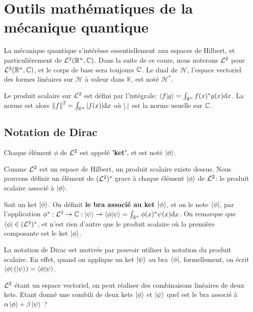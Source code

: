 \chapter{Outils mathématiques de la mécanique quantique}

La mécanique quantique s'intérèsse essentiellement aux espaces de Hilbert, et
particulièrement de $\mathcal{L}^{2}(\mathbb{R}^{n}, \mathbb{C})$. Dans la suite de ce
cours, nous noterons $\mathcal{L}^{2}$ pour $\mathcal{L}^{2}(\mathbb{R}^{n}, \mathbb{C})$, et le corps de
base sera toujours $\mathbb{C}$.
Le dual de $\mathcal{H}$, l'espace vectoriel des formes linéaires sur
$\mathcal{H}$ à valeur dans $\mathbb{K}$, est noté $\mathcal{H}^{*}$.

Le produit scalaire sur $\mathcal{L}^{2}$ est défini par l'intégrale: $\bra{f}\ket{g} =
\int_{\mathbb{R}^{n}} f(x)^{*} g(x) \mathrm{d}x$. La norme est alors $\norm{f}^{2} =
\int_{\mathbb{R}^{n}} \abs{f(x)} \mathrm{d}x$ où $\abs{.}$ est la norme usuelle sur
$\mathbb{C}$.

\section{Notation de Dirac}

\begin{definition} [Ket]
	Chaque élément $\phi$ de $\mathcal{L}^{2}$ est appelé \textbf{'ket'}, et est noté
	$\ket{\phi}$.
\end{definition}

Comme $\mathcal{L}^{2}$ est un espace de Hilbert, un produit scalaire existe dessus. Nous
pouvons définir un élément de $(\mathcal{L}^{2})^{*}$ grace à chaque élément $\ket{\phi}$
de $\mathcal{L}^{2}$: le produit scalaire associé à $\ket{\phi}$.

\begin{definition} [Bra]
	Soit un ket $\ket{\phi}$. On définit \textbf{le bra associé au ket
	$\ket{\phi}$}, et on le note $\bra{\phi}$, par l'application $\phi^{*} :
	\mathcal{L}^{2} \rightarrow \mathbb{C} : \ket{\psi} \rightarrow \bra{\phi}\ket{\psi} =
	\int_{\mathbb{R}^{n}} \phi(x)^{*} \psi(x) \mathrm{d}x$.
	On remarque que $\bra{\phi} \in (\mathcal{L}^{2})^{*}$, et n'est rien d'autre que le
	produit scalaire où la première composante est le ket $\ket{\phi}$.

	La notation de Dirac est motivée par pouvoir utiliser la notation du produit
	scalaire.
	En effet, quand on applique un ket $\ket{\psi}$ au bra $\bra{\phi}$,
	formellement, on écrit $\bra{\phi}(\ket{\psi}) = \bra{\phi}\ket{\psi}$.
\end{definition}

$\mathcal{L}^{2}$ étant un espace vectoriel, on peut réaliser des combinaisons linéaires
de deux kets. Etant donné une combili de deux kets $\ket{\phi}$ et $\ket{\psi}$
quel est le bra associé à $\alpha \ket{\phi} + \beta \ket{\psi}$ ?

